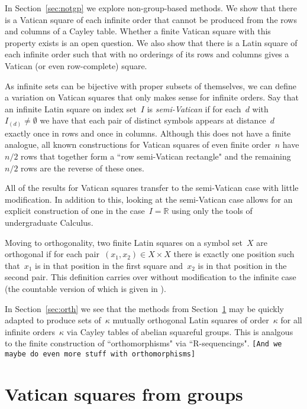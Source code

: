 \documentclass[12pt,a4paper]{article}
\newcommand{\R}{\mathbb{R}}
\begin{document}
In Section~\ref{sec:notgp} we explore non-group-based methods.  We show that there is a Vatican square of each infinite order that cannot be produced from the rows and columns of a Cayley table.  Whether a finite Vatican square with this property exists is an open question.  We also show that there is a Latin square of each infinite order such that with no orderings of its rows and columns gives a Vatican (or even row-complete) square.


As infinite sets can be bijective with proper subsets of themselves, we can define a variation on Vatican squares that only makes sense for infinite orders.
Say that an infinite Latin square on index set~$I$ is {\em semi-Vatican} if for each~$d$ with~$I_{(d)} \neq \emptyset$ we have that each pair of distinct symbols appears at distance~$d$ exactly once in rows and once in columns.  Although this does not have a finite analogue, all known constructions for Vatican squares of even finite order~$n$ have $n/2$ rows that together form a ``row semi-Vatican rectangle" and the remaining $n/2$ rows are the reverse of these ones.

All of the results for Vatican squares transfer to the semi-Vatican case with little modification.  In addition to this, looking at the semi-Vatican case allows for an explicit construction of one in the case~$I = \R$ using only the tools of undergraduate Calculus.


Moving to orthogonality, two finite Latin squares on a symbol set~$X$ are orthogonal if for  each pair~$(x_1, x_2) \in X \times X$ there is exactly one position such that~$x_1$ is in that position in the first square and~$x_2$ is in that position in the second pair.  This definition carries over without modification to the infinite case (the countable version of which is given in \cite[p.~116]{DK15}).

In Section~\ref{sec:orth} we see that the methods from Section~\ref{sec:cayley} may be quickly adapted to produce sets of~$\kappa$ mutually orthogonal Latin squares of order~$\kappa$ for all infinite orders~$\kappa$ via Cayley tables of abelian squareful groups.  This is analgous to the finite construction of ``orthomorphisms" via ``R-sequencings".  \texttt{[And we maybe do even more stuff with orthomorphisms]}  


\section{Vatican squares from groups}\label{sec:cayley}
\end{document}
